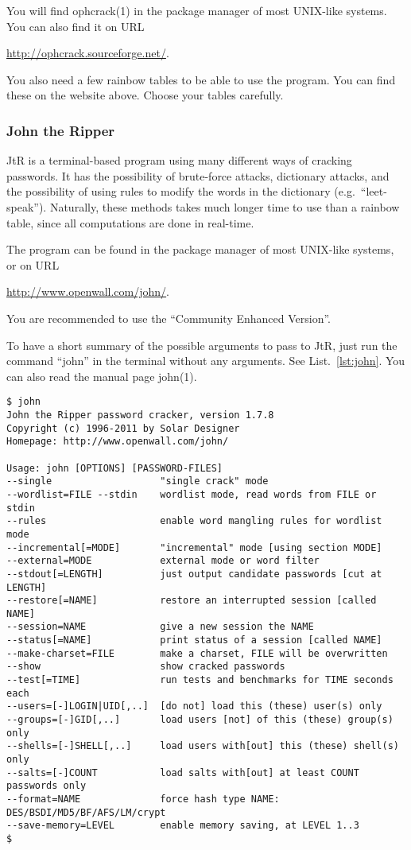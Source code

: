 You will find ophcrack(1) in the package manager of most UNIX-like systems.
You can also find it on URL
\begin{center}
  \url{http://ophcrack.sourceforge.net/}.
\end{center}
You also need a few rainbow tables to be able to use the program.
You can find these on the website above.
Choose your tables carefully.

\subsubsection{John the Ripper}

\ac{JtR} is a terminal-based program using many different ways of cracking 
passwords.
It has the possibility of brute-force attacks, dictionary attacks, and the 
possibility of using rules to modify the words in the dictionary 
(e.g.~\enquote{leet-speak}).
Naturally, these methods takes much longer time to use than a rainbow table, 
since all computations are done in real-time.

The program can be found in the package manager of most UNIX-like systems, or 
on URL
\begin{center}
  \url{http://www.openwall.com/john/}.
\end{center}
You are recommended to use the \enquote{Community Enhanced Version}.

To have a short summary of the possible arguments to pass to \ac{JtR}, just run 
the command \enquote{john} in the terminal without any arguments.
See List.~\ref{lst:john}.
You can also read the manual page john(1).

\begin{lstlisting}[float,caption={Output from \ac{JtR} in the 
terminal.},label={lst:john},breaklines=false]
$ john
John the Ripper password cracker, version 1.7.8
Copyright (c) 1996-2011 by Solar Designer
Homepage: http://www.openwall.com/john/

Usage: john [OPTIONS] [PASSWORD-FILES]
--single                   "single crack" mode
--wordlist=FILE --stdin    wordlist mode, read words from FILE or stdin
--rules                    enable word mangling rules for wordlist mode
--incremental[=MODE]       "incremental" mode [using section MODE]
--external=MODE            external mode or word filter
--stdout[=LENGTH]          just output candidate passwords [cut at LENGTH]
--restore[=NAME]           restore an interrupted session [called NAME]
--session=NAME             give a new session the NAME
--status[=NAME]            print status of a session [called NAME]
--make-charset=FILE        make a charset, FILE will be overwritten
--show                     show cracked passwords
--test[=TIME]              run tests and benchmarks for TIME seconds each
--users=[-]LOGIN|UID[,..]  [do not] load this (these) user(s) only
--groups=[-]GID[,..]       load users [not] of this (these) group(s) only
--shells=[-]SHELL[,..]     load users with[out] this (these) shell(s) only
--salts=[-]COUNT           load salts with[out] at least COUNT passwords only
--format=NAME              force hash type NAME: DES/BSDI/MD5/BF/AFS/LM/crypt
--save-memory=LEVEL        enable memory saving, at LEVEL 1..3
$
\end{lstlisting}

